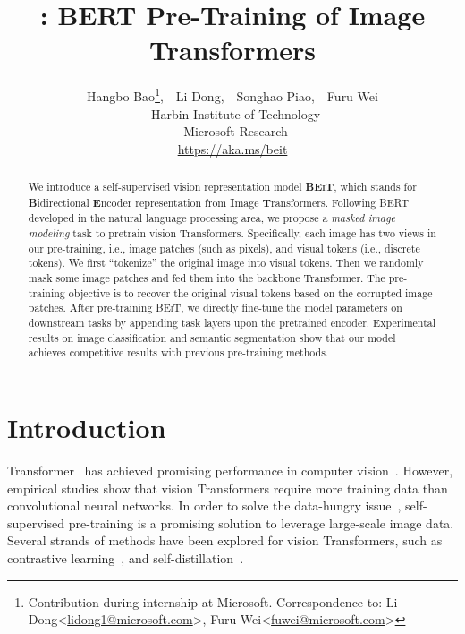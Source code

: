 \documentclass{article}
\title{\our{}: BERT Pre-Training of Image Transformers}
\author{Hangbo Bao\thanks{Contribution during internship at Microsoft. Correspondence to: Li Dong\textless{}\href{mailto:lidong1@microsoft.com}{lidong1@microsoft.com}\textgreater{}, Furu Wei\textless{}\href{mailto:fuwei@microsoft.com}{fuwei@microsoft.com}\textgreater{}},~~Li Dong,~~Songhao Piao,~~Furu Wei \\
~Harbin Institute of Technology \\
~Microsoft Research \\
\url{https://aka.ms/beit} \\
}
\newcommand\our{\textsc{BEiT}}
\begin{document}
\maketitle

\begin{abstract}
We introduce a self-supervised vision representation model \textbf{\our{}}, which stands for \textbf{B}idirectional \textbf{E}ncoder representation from \textbf{I}mage \textbf{T}ransformers. Following BERT~\citep{bert} developed in the natural language processing area, we propose a \textit{masked image modeling} task to pretrain vision Transformers. Specifically, each image has two views in our pre-training, i.e., image patches (such as  pixels), and visual tokens (i.e., discrete tokens). We first ``tokenize'' the original image into visual tokens. Then we randomly mask some image patches and fed them into the backbone Transformer. The pre-training objective is to recover the original visual tokens based on the corrupted image patches. After pre-training \our{}, we directly fine-tune the model parameters on downstream tasks by appending task layers upon the pretrained encoder. Experimental results on image classification and semantic segmentation show that our model achieves competitive results with previous pre-training methods.
\end{abstract}


\section{Introduction}
\label{sec:intro}

Transformer~\citep{transformer} has achieved promising performance in computer vision~\citep{vit,deit}.
However, empirical studies show that vision Transformers require more training data than convolutional neural networks.
In order to solve the data-hungry issue~\citep{vit:small:data}, self-supervised pre-training is a promising solution to leverage large-scale image data.
Several strands of methods have been explored for vision Transformers, such as contrastive learning~\citep{mocov3,swin:ssl}, and self-distillation~\citep{dino}.
\end{document}

